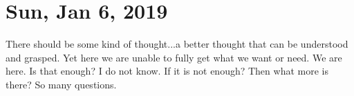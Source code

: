 \section{Sun, Jan 6, 2019}

There should be some kind of thought...a better thought that can be
understood and grasped. Yet here we are unable to fully get what
we want or need. We are here. Is that enough? I do not know. If it
is not enough? Then what more is there? So many questions.